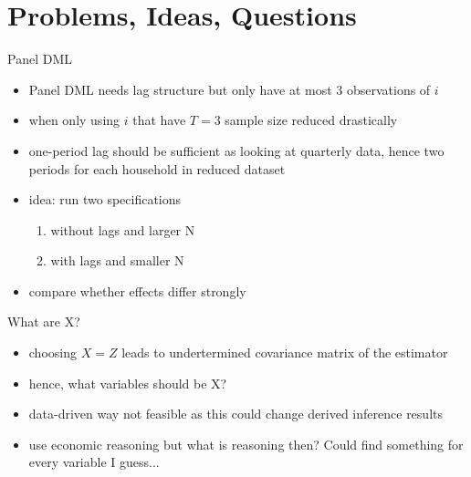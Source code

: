 \documentclass[a4paper, 12pt]{beamer}
\begin{document}
\section{Problems, Ideas, Questions}
\begin{frame}{Panel DML}
  \begin{itemize}
    \item Panel DML needs lag structure but only have at most 3 observations of $i$
    \item when only using $i$ that have $T=3$ sample size reduced drastically 
    \item one-period lag should be sufficient as looking at quarterly data, hence two periods for each household in reduced dataset
    \item idea: run two specifications
    \begin{enumerate}
      \item without lags and larger N
      \item with lags and smaller N 
    \end{enumerate}
    \item compare whether effects differ strongly 
  \end{itemize}
\end{frame}

\begin{frame}{What are X?}
  \begin{itemize}
    \item choosing $X=Z$ leads to undertermined covariance matrix of the estimator 
    \item hence, what variables should be X? 
    \item data-driven way not feasible as this could change derived inference results 
    \item use economic reasoning but what is reasoning then? Could find something for every variable I guess... 
  \end{itemize}
\end{frame}
\end{document}
